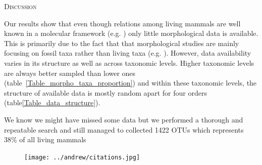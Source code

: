 \documentclass[12pt,letterpaper]{article}
\renewcommand{\section}[1]{%
\bigskip
\begin{center}
\begin{Large}
\normalfont\scshape #1
\medskip
\end{Large}
\end{center}}
\renewcommand{\subsection}[1]{%
\bigskip
\begin{center}
\begin{large}
\normalfont\itshape #1
\end{large}
\end{center}}
\begin{document}


%
%

\section{Discussion}
Our results show that even though relations among living mammals are well known in a molecular framework (e.g. \cite{FritzTree,meredithimpacts2011,May-Collado-PeerJ}) only little morphological data is available. This is primarily due to the fact that that morphological studies are mainly focusing on fossil taxa rather than living taxa (e.g. \cite{O'Leary08022013,ni2013oldest}). However, data availability varies in its structure as well as across taxonomic levels. Higher taxonomic levels are always better sampled than lower ones (table~\ref{Table_morpho_taxa_proportion}) and within these taxonomic levels, the structure of available data is mostly random apart for four orders (table\ref{Table_data_structure}).

We know we might have missed some data but we performed a thorough and repeatable search and still managed to collected 1422 OTUs which represents 38\% of all living mammals

\begin{figure}[!htbp]
\centering
    \texttt{[image: ../andrew/citations.jpg]}
\caption{ }
\label{bla}
\end{figure}
\end{document}

